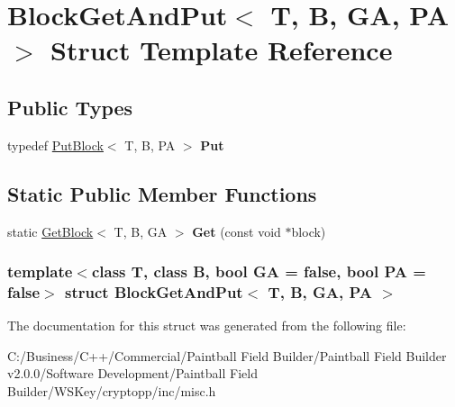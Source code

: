 \hypertarget{struct_block_get_and_put}{
\section{BlockGetAndPut$<$ T, B, GA, PA $>$ Struct Template Reference}
\label{struct_block_get_and_put}
}
\subsection*{Public Types}
\begin{DoxyCompactItemize}
\item 
\hypertarget{struct_block_get_and_put_a63d96a17e8118407e02896d0b0f8d92d}{
typedef \hyperlink{class_put_block}{PutBlock}$<$ T, B, PA $>$ {\bfseries Put}}
\label{struct_block_get_and_put_a63d96a17e8118407e02896d0b0f8d92d}

\end{DoxyCompactItemize}
\subsection*{Static Public Member Functions}
\begin{DoxyCompactItemize}
\item 
\hypertarget{struct_block_get_and_put_a07781cc0817613fe47e8070999cf4b95}{
static \hyperlink{class_get_block}{GetBlock}$<$ T, B, GA $>$ {\bfseries Get} (const void $\ast$block)}
\label{struct_block_get_and_put_a07781cc0817613fe47e8070999cf4b95}

\end{DoxyCompactItemize}
\subsubsection*{template$<$class T, class B, bool GA = false, bool PA = false$>$ struct BlockGetAndPut$<$ T, B, GA, PA $>$}



The documentation for this struct was generated from the following file:\begin{DoxyCompactItemize}
\item 
C:/Business/C++/Commercial/Paintball Field Builder/Paintball Field Builder v2.0.0/Software Development/Paintball Field Builder/WSKey/cryptopp/inc/misc.h\end{DoxyCompactItemize}
